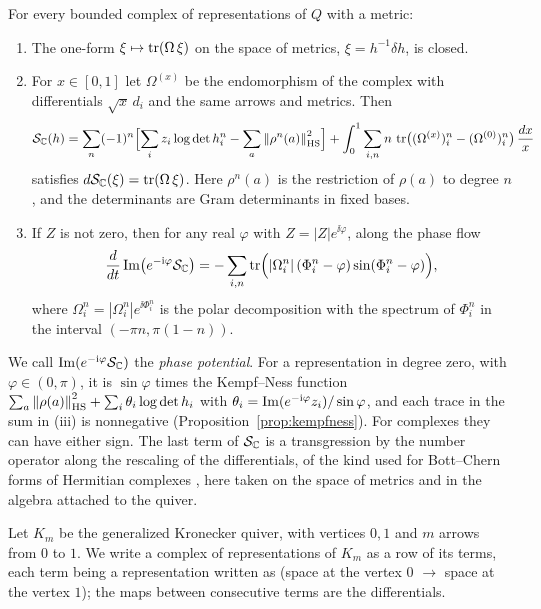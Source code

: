 \begin{theorem}[Primitive]\label{thm:introA}
For every bounded complex of representations of $Q$ with a metric:
\begin{enumerate}
\item[(i)] The one-form $\xi\mapsto\operatorname{tr}(\Omega\,\xi)$ on the space of metrics,
 $\xi=h^{-1}\delta h$, is closed.
\item[(ii)] For $x\in[0,1]$ let $\Omega^{(x)}$ be the endomorphism of the
 complex with differentials $\sqrt x\,d_i$ and the same arrows and metrics.
 Then
 \[
 \mathcal S_{\mathbb C}(h)=\sum_n(-1)^n\Bigl[\sum_iz_i\log\det h_i^n-\sum_a\left\lVert\rho^n(a)\right\rVert^2_{\mathrm{HS}}\Bigr]
 +\int_0^1\sum_{i,n}n\,\operatorname{tr}\bigl((\Omega^{(x)})_i^n-(\Omega^{(0)})_i^n\bigr)\,\frac{dx}x
 \]
 satisfies $d\mathcal S_{\mathbb C}(\xi)=\operatorname{tr}(\Omega\,\xi)$. Here $\rho^n(a)$ is the
 restriction of $\rho(a)$ to degree $n$, and the determinants are Gram
 determinants in fixed bases.
\item[(iii)] If $Z$ is not zero, then for any real $\varphi$ with
 $Z=|Z|e^{\ii\varphi}$, along the phase flow
 \[
 \frac d{dt}\operatorname{Im}\bigl(e^{-\mathrm i\varphi}\mathcal S_{\mathbb C}\bigr)
 =-\sum_{i,n}\operatorname{tr}\Bigl(|\Omega_i^n|\,(\Phi_i^n-\varphi)\sin(\Phi_i^n-\varphi)\Bigr),
 \]
 where $\Omega_i^n=|\Omega_i^n|e^{\ii\Phi_i^n}$ is the polar decomposition
 with the spectrum of $\Phi_i^n$ in the interval
 \mbox{$(-\pi n,\pi(1-n))$}.
\end{enumerate}
\end{theorem}

We call $\operatorname{Im}(e^{-\mathrm i\varphi}\mathcal S_{\mathbb C})$ the \emph{phase potential}. For a
representation in degree zero, with $\varphi\in(0,\pi)$, it is
$\sin\varphi$ times the Kempf--Ness function
$\sum_a\left\lVert\rho(a)\right\rVert^2_{\mathrm{HS}}+\sum_i\theta_i\log\det h_i$ with
$\theta_i=\operatorname{Im}(e^{-\mathrm i\varphi}z_i)/\sin\varphi$, and each trace in the sum
in (iii) is nonnegative (Proposition~\ref{prop:kempfness}). For complexes
they can have either sign. The last term of $\mathcal S_{\mathbb C}$ is a transgression by
the number operator along the rescaling of the differentials, of the kind
used for Bott--Chern forms of Hermitian complexes \cite{bgs88}, here taken on
the space of metrics and in the algebra attached to the quiver.

Let $K_m$ be the generalized Kronecker quiver, with vertices $0,1$ and $m$
arrows from $0$ to $1$. We write a complex of representations of $K_m$ as a
row of its terms, each term being a representation written as (space at the
vertex $0$ $\to$ space at the vertex $1$); the maps between consecutive terms
are the differentials.

